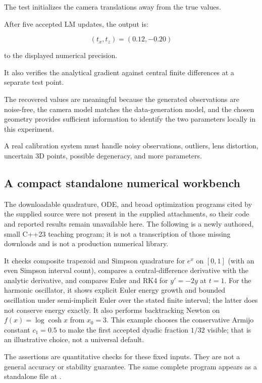 The test initializes the camera translations away from the true values.

After five accepted LM updates, the output is:

\[
\boxed{ (t_x,t_z)=(0.12,-0.20) }
\]

to the displayed numerical precision.

It also verifies the analytical gradient against central finite differences at a separate test point.

The recovered values are meaningful because the generated observations are noise-free, the camera model matches the data-generation model, and the chosen geometry provides sufficient information to identify the two parameters locally in this experiment.

A real calibration system must handle noisy observations, outliers, lens distortion, uncertain 3D points, possible degeneracy, and more parameters.

\subsection{A compact standalone numerical workbench}\label{02-foundations-ii-ch028-a-compact-standalone-numerical-workbench}

\hypertarget{02-foundations-ii-ch028-a-compact-standalone-numerical-workbench}{}

The downloadable quadrature, ODE, and broad optimization programs cited by the supplied source were not present in the supplied attachments, so their code and reported results remain unavailable here. The following is a newly authored, small C++23 teaching program; it is not a transcription of those missing downloads and is not a production numerical library.

It checks composite trapezoid and Simpson quadrature for \(e^x\) on \([0,1]\) (with an even Simpson interval count), compares a central-difference derivative with the analytic derivative, and compares Euler and RK4 for \(y'=-2y\) at \(t=1\). For the harmonic oscillator, it shows explicit Euler energy growth and bounded oscillation under semi-implicit Euler over the stated finite interval; the latter does not conserve energy exactly. It also performs backtracking Newton on \(f(x)=\log\cosh x\) from \(x_0=3\). This example chooses the conservative Armijo constant \(c_1=0.5\) to make the first accepted dyadic fraction \(1/32\) visible; that is an illustrative choice, not a universal default.

The assertions are quantitative checks for these fixed inputs. They are not a general accuracy or stability guarantee. The same complete program appears as a standalone file at {}.

